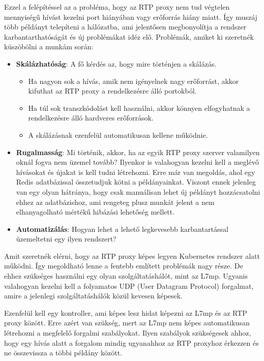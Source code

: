 Ezzel a felépítéssel az a probléma, hogy az RTP proxy nem tud végtelen mennyiségű
hívást kezelni port hiányában vagy erőforrás hiány miatt. Így muszáj több példányt
telepíteni a hálózatba, ami jelentősen megbonyolítja a rendszer 
karbantarthatóságát és új problémákat idéz elő. Problémák, amiket ki szeretnék 
küszöbölni a munkám során:

\begin{itemize}
	\item \textbf{Skálázhatóság}: A fő kérdés az, hogy mire történjen a skálázás. 
	\begin{itemize}
		\item Ha nagyon sok a hívás, amik nem igényelnek nagy erőforrást, akkor
		kifuthat az RTP proxy a rendelkezésre álló portokból.
		\item Ha túl sok transzkódolást kell használni, akkor könnyen elfogyhatnak
		a rendelkezésre álló hardveres erőforrások.
		\item A skálázásnak ezenfelül automatikusan kellene működnie. 
	\end{itemize}
	\item \textbf{Rugalmasság}: Mi történik, akkor, ha az egyik RTP proxy szerver
	valamilyen oknál fogva nem üzemel tovább? Ilyenkor is valahogyan kezelni 
	kell a meglévő hívásokat és újakat is kell tudni létrehozni. Erre már van 
	megoldás, ahol egy Redis adatbázissal összetudjuk kötni a példányainkat. 
	Viszont ennek jelenleg van egy olyan hátránya, hogy csak manuálisan lehet 
	új példányt hozzácsatolni ehhez az adatbázishoz, ami rengeteg plusz munkát 
	jelent a nem elhanyagolható mértékű hibázási lehetőség mellett.
	\item \textbf{Automatizálás}: Hogyan lehet a lehető legkevesebb 
	karbantartással üzemeltetni egy ilyen rendszert? 
\end{itemize}

Amit szeretnék elérni, hogy az RTP proxy képes legyen Kubernetes rendszer alatt 
működni. Így megoldható lenne a fentebb említett problémák nagy része. De 
ehhez szükséges használni egy olyan szolgáltatáshálót, mint az L7mp. Ugyanis 
valahogyan kezelni kell a folyamatos UDP (User Datagram Protocol) forgalmat, amire
a jelenlegi szolgáltatáshálók közül kevesen képesek.

Ezenfelül kell egy kontroller, ami képes lesz hidat képezni az L7mp és az RTP 
proxy között. Erre azért van szükség, mert az L7mp nem képes automatikusan 
létrehozni a megfelelő forgalmi szabályokat. Ilyen szabályok szükségesek ahhoz, 
hogy egy hívás alatt a forgalom mindig ugyanahhoz az RTP proxyhoz érkezzen és 
ne összevissza a többi példány között.  


